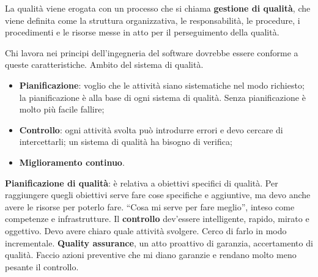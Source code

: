 La qualità viene erogata con un processo che si chiama \textbf{gestione di qualità}, che viene definita come la struttura organizzativa, le responsabilità, le procedure, i procedimenti e le risorse messe in atto per il perseguimento della qualità.

Chi lavora nei principi dell'ingegneria del software dovrebbe essere conforme a queste caratteristiche. Ambito del sistema di qualità.

\begin{itemize}

	\item \textbf{Pianificazione}: voglio che le attività siano sistematiche nel modo richiesto; la pianificazione è alla base di ogni sistema di qualità. Senza pianificazione è molto più facile fallire;
	\item \textbf{Controllo}: ogni attività svolta può introdurre errori e devo cercare di intercettarli; un sistema di qualità ha bisogno di verifica;
	\item \textbf{Miglioramento continuo}.

\end{itemize}

\textbf{Pianificazione di qualità}: è relativa a obiettivi specifici di qualità. Per raggiungere quegli obiettivi serve fare cose specifiche e aggiuntive, ma devo anche avere le risorse per poterlo fare. ``Cosa mi serve per fare meglio'', inteso come competenze e infrastrutture. Il \textbf{controllo} dev'essere intelligente, rapido, mirato e oggettivo. Devo avere chiaro quale attività svolgere. Cerco di farlo in modo incrementale. \textbf{Quality assurance}, un atto proattivo di garanzia, accertamento di qualità. Faccio azioni preventive che mi diano garanzie e rendano molto meno pesante il controllo.
